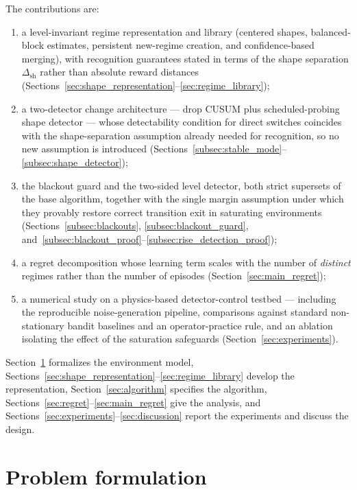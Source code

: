 \documentclass[11pt]{article}
\begin{document}
The contributions are:
\begin{enumerate}
\item a level-invariant regime representation and library (centered shapes, balanced-block estimates, persistent new-regime creation, and confidence-based merging), with recognition guarantees stated in terms of the shape separation $\Delta_{\mathrm{sh}}$ rather than absolute reward distances (Sections~\ref{sec:shape_representation}--\ref{sec:regime_library});
\item a two-detector change architecture --- drop CUSUM plus scheduled-probing shape detector --- whose detectability condition for direct switches coincides with the shape-separation assumption already needed for recognition, so no new assumption is introduced (Sections~\ref{subsec:stable_mode}--\ref{subsec:shape_detector});
\item the blackout guard and the two-sided level detector, both strict supersets of the base algorithm, together with the single margin assumption under which they provably restore correct transition exit in saturating environments (Sections~\ref{subsec:blackouts}, \ref{subsec:blackout_guard}, and~\ref{subsec:blackout_proof}--\ref{subsec:rise_detection_proof});
\item a regret decomposition whose learning term scales with the number of \emph{distinct} regimes rather than the number of episodes (Section~\ref{sec:main_regret});
\item a numerical study on a physics-based detector-control testbed --- including the reproducible noise-generation pipeline, comparisons against standard non-stationary bandit baselines and an operator-practice rule, and an ablation isolating the effect of the saturation safeguards (Section~\ref{sec:experiments}).
\end{enumerate}

Section~\ref{sec:problem_formulation} formalizes the environment model, Sections~\ref{sec:shape_representation}--\ref{sec:regime_library} develop the representation, Section~\ref{sec:algorithm} specifies the algorithm, Sections~\ref{sec:regret}--\ref{sec:main_regret} give the analysis, and Sections~\ref{sec:experiments}--\ref{sec:discussion} report the experiments and discuss the design.

\section{Problem formulation}
\label{sec:problem_formulation}
\end{document}
